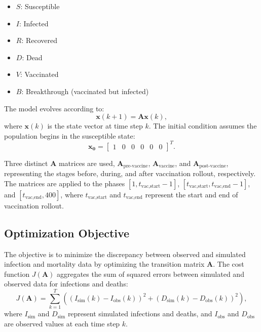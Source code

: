 \documentclass[conference]{IEEEtran}
\begin{document}
\begin{itemize}
    \item $S$: Susceptible
    \item $I$: Infected
    \item $R$: Recovered
    \item $D$: Dead
    \item $V$: Vaccinated
    \item $B$: Breakthrough (vaccinated but infected)
\end{itemize}

The model evolves according to:
\begin{equation}
    \mathbf{x}(k+1) = \mathbf{A} \mathbf{x}(k),
\end{equation}
where $\mathbf{x}(k)$ is the state vector at time step $k$. The initial condition assumes the population begins in the susceptible state:
\begin{equation}
    \mathbf{x_0} = \begin{bmatrix} 1 & 0 & 0 & 0 & 0 & 0 \end{bmatrix}^T.
\end{equation}

Three distinct $\mathbf{A}$ matrices are used, $\mathbf{A}_{\text{pre-vaccine}}$, $\mathbf{A}_{\text{vaccine}}$, and $\mathbf{A}_{\text{post-vaccine}}$, representing the stages before, during, and after vaccination rollout, respectively. The matrices are applied to the phases $[1, t_{\text{vac,start}} - 1]$, $[t_{\text{vac,start}}, t_{\text{vac,end}} - 1]$, and $[t_{\text{vac,end}}, 400]$, where $t_{\text{vac,start}}$ and $t_{\text{vac,end}}$ represent the start and end of vaccination rollout.

\subsection{Optimization Objective}
The objective is to minimize the discrepancy between observed and simulated infection and mortality data by optimizing the transition matrix $\mathbf{A}$. The cost function $J(\mathbf{A})$ aggregates the sum of squared errors between simulated and observed data for infections and deaths:
\begin{equation}
    J(\mathbf{A}) = \sum_{k=1}^T \left( (I_{\text{sim}}(k) - I_{\text{obs}}(k))^2 + (D_{\text{sim}}(k) - D_{\text{obs}}(k))^2 \right),
\end{equation}
where $I_{\text{sim}}$ and $D_{\text{sim}}$ represent simulated infections and deaths, and $I_{\text{obs}}$ and $D_{\text{obs}}$ are observed values at each time step $k$.
\end{document}
